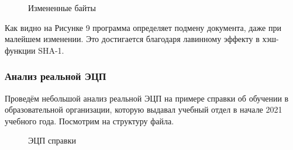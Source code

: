 \begin{figure}[h!]
  \caption{Измененные байты}
\end{figure}

Как видно на Рисунке 9 программа определяет подмену документа, даже при малейшем изменении. Это достигается благодаря лавинному эффекту 
в хэш-функции SHA-1.

\subsubsection{Анализ реальной ЭЦП}

Проведём небольшой анализ реальной ЭЦП на примере справки об обучении в образовательной организации, которую выдавал учебный отдел в
начале 2021 учебного года. Посмотрим на структуру файла.

\begin{figure}[h!]
  \caption{ЭЦП справки}
\end{figure}

